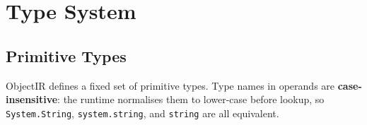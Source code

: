 \documentclass[11pt,a4paper]{article}
\begin{document}
\section{Type System}
\label{sec:types}

\subsection{Primitive Types}

ObjectIR defines a fixed set of primitive types. Type names in operands are
\textbf{case-insensitive}: the runtime normalises them to lower-case before
lookup, so \texttt{System.String}, \texttt{system.string}, and \texttt{string}
are all equivalent.
\end{document}
